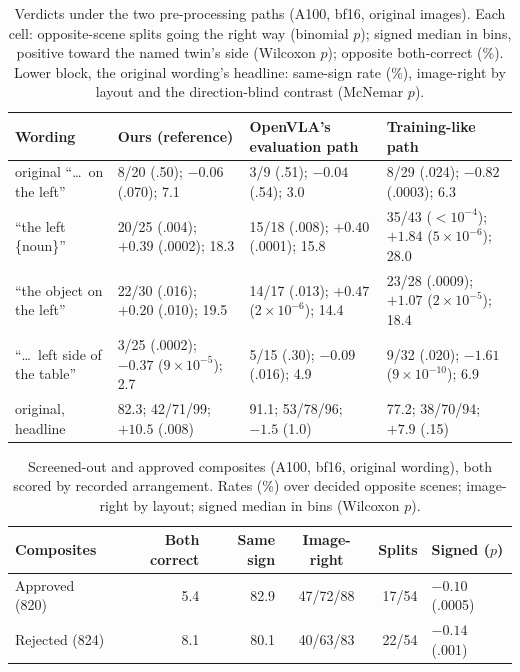 \documentclass[conference]{IEEEtran}
\begin{document}
\begin{table}[t]
\centering
\scriptsize
\setlength{\tabcolsep}{3pt}
\caption{Verdicts under the two pre-processing paths (A100, bf16, original images). Each cell: opposite-scene splits going the right way (binomial $p$); signed median in bins, positive toward the named twin's side (Wilcoxon $p$); opposite both-correct (\%). Lower block, the original wording's headline: same-sign rate (\%), image-right by layout and the direction-blind contrast (McNemar $p$).}
\label{tab:prepro}
\begin{tabular}{@{}l l l l@{}}
\toprule
Wording & Ours (reference) & OpenVLA's evaluation path & Training-like path\\
\midrule
original ``\dots\ on the left'' & 8/20 (.50); $-0.06$ (.070); 7.1 & 3/9 (.51); $-0.04$ (.54); 3.0 & 8/29 (.024); $-0.82$ (.0003); 6.3\\
``the left \{noun\}'' & 20/25 (.004); $+0.39$ (.0002); 18.3 & 15/18 (.008); $+0.40$ (.0001); 15.8 & 35/43 ($<10^{-4}$); $+1.84$ ($5\times10^{-6}$); 28.0\\
``the object on the left'' & 22/30 (.016); $+0.20$ (.010); 19.5 & 14/17 (.013); $+0.47$ ($2\times10^{-6}$); 14.4 & 23/28 (.0009); $+1.07$ ($2\times10^{-5}$); 18.4\\
``\dots\ left side of the table'' & 3/25 (.0002); $-0.37$ ($9\times10^{-5}$); 2.7 & 5/15 (.30); $-0.09$ (.016); 4.9 & 9/32 (.020); $-1.61$ ($9\times10^{-10}$); 6.9\\
\midrule
original, headline & 82.3; 42/71/99; $+10.5$ (.008) & 91.1; 53/78/96; $-1.5$ (1.0) & 77.2; 38/70/94; $+7.9$ (.15)\\
\bottomrule
\end{tabular}
\end{table}

\begin{table}[t]
\centering
\scriptsize
\setlength{\tabcolsep}{2.5pt}
\caption{Screened-out and approved composites (A100, bf16, original wording), both scored by recorded arrangement. Rates (\%) over decided opposite scenes; image-right by layout; signed median in bins (Wilcoxon $p$).}
\label{tab:screen}
\begin{tabular}{@{}l r r c r l@{}}
\toprule
Composites & Both correct & Same sign & Image-right & Splits & Signed ($p$)\\
\midrule
Approved (820) & 5.4 & 82.9 & 47/72/88 & 17/54 & $-0.10$ (.0005)\\
Rejected (824) & 8.1 & 80.1 & 40/63/83 & 22/54 & $-0.14$ (.001)\\
\bottomrule
\end{tabular}
\end{table}
\end{document}
